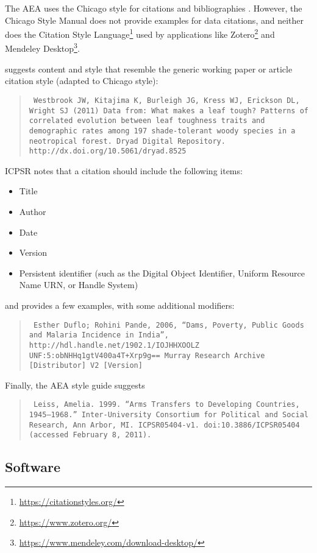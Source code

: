 \documentclass[AEJ]{AEA}
\newcommand{\citep}{\parencite}
\newcommand{\citet}{\textcite}
\begin{document}
The AEA uses the Chicago style for citations and bibliographies \citep{aeadatarefs}. However, the Chicago Style Manual \citep{citation-machine,ChicagoManualofStyleChicagoManualStyle2018} does not provide examples for data citations, and neither does the Citation Style Language\footnote{\url{https://citationstyles.org/}} used by applications like Zotero\footnote{\url{https://www.zotero.org/}} and Mendeley Desktop\footnote{\url{https://www.mendeley.com/download-desktop/}}.


\citet{dataone-cite} suggests content and style that resemble the generic working paper or article citation style (adapted to Chicago style):
\begin{quote}\tt
    Westbrook JW, Kitajima K, Burleigh JG, Kress WJ, Erickson DL, Wright SJ (2011) Data from: What makes a leaf tough? Patterns of correlated evolution between leaf toughness traits and demographic rates among 197 shade-tolerant woody species in a neotropical forest. Dryad Digital Repository. http://dx.doi.org/10.5061/dryad.8525
\end{quote}
ICPSR \citep{icpsr-data-cite} notes  that a citation should include the following items:
\begin{itemize}
    \item   Title
    \item   Author
    \item   Date
    \item   Version
    \item   Persistent identifier (such as the Digital Object Identifier, Uniform Resource Name URN, or Handle System)
\end{itemize}
and provides a few examples, with some additional modifiers:
\begin{quote}\tt
    Esther Duflo; Rohini Pande, 2006, ``Dams, Poverty, Public Goods and Malaria Incidence in India'', http://hdl.handle.net/1902.1/IOJHHXOOLZ UNF:5:obNHHq1gtV400a4T+Xrp9g== Murray Research Archive [Distributor] V2 [Version]
\end{quote}
Finally, the AEA style guide \citep{aeadatarefs} suggests
\begin{quote}\tt
    Leiss, Amelia. 1999. ``Arms Transfers to Developing Countries, 1945--1968.'' 
    Inter-University Consortium for Political and Social Research, Ann Arbor, MI. 
    ICPSR05404-v1. doi:10.3886/ICPSR05404 (accessed February 8, 2011).
\end{quote}

\subsection{Software}
\end{document}
